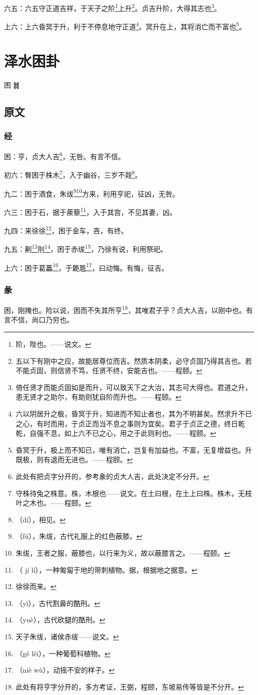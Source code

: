 \documentclass[12pt,oneside]{book}
\begin{document}
六五：六五守正道吉祥，于天子之阶\footnote{阶，陛也。——说文。}上升\footnote{五以下有刚中之应，故能居尊位而吉。然质本阴柔，必守贞固乃得其吉也。若不能贞固，则信贤不笃，任贤不终，安能吉也。——程颐。}。贞吉升阶，大得其志也\footnote{倚任贤才而能贞固如是而升，可以致天下之大治，其志可大得也。君道之升，患无贤才之助尔，有助则犹自阶而升也。——程颐。}。

上六：上六昏冥于升，利于不停息地守正道\footnote{六以阴居升之极，昏冥于升，知进而不知止者也，其为不明甚矣。然求升不已之心，有时而用，于贞正而当不息之事则为宜矣。君子于贞正之德，终日乾乾，自强不息，如上六不已之心，用之于此则利也。——程颐。}。冥升在上，其将消亡而不富也\footnote{昏冥于升，极上而不知已，唯有消亡，岂复有加益也。不富，无复增益也。升既极，则有退而无进也。——程颐。}。


\chapter{泽水困卦}
困 {\Large ䷮}

\section{原文}

\subsection{经}
困：亨，贞大人吉\footnote{此处有把贞字分开的，参考彖的贞大人吉，此处决定不分开。}，无咎。有言不信。

初六：臀困于株木\footnote{守株待兔之株意。株，木根也——说文。在土曰根，在土上曰株。株木，无枝叶之木也。——程颐。}，入于幽谷，三岁不觌\footnote{（dí），相见。}。

九二：困于酒食，朱绂\footnote{（fú），朱绂，古代礼服上的红色蔽膝。}\footnote{朱绂，王者之服，蔽膝也，以行来为义，故以蔽膝言之。——程颐。}方来，利用亨祀，征凶，无咎。

六三：困于石，据于蒺藜\footnote{（ jí lí），一种匍匐于地的带刺植物。据，根据地之据意。}，入于其宫，不见其妻，凶。

九四：来徐徐\footnote{徐徐而来。}，困于金车，吝，有终。

九五：劓\footnote{（yì），古代割鼻的酷刑。}刖\footnote{（yuè），古代砍腿的酷刑。}，困于赤绂\footnote{天子朱绂，诸侯赤绂——说文。}，乃徐有说，利用祭祀。

上六：困于葛藟\footnote{（gě lěi），一种葡萄科植物。}，于臲卼\footnote{（niè wù），动摇不安的样子。}，曰动悔。有悔，征吉。

\subsection{彖}
困，刚掩也。险以说，困而不失其所亨\footnote{此处有将亨字分开的，多方考证，王弼，程颐，东坡易传等皆是不分开。}，其唯君子乎？贞大人吉，以刚中也。有言不信，尚口乃穷也。
\end{document}
